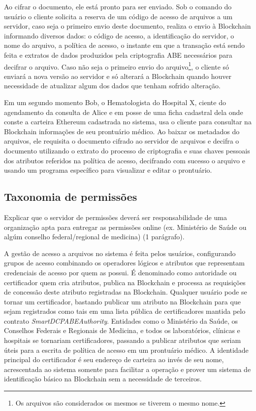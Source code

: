 \documentclass[a4paper,11pt]{article}
\begin{document}
Ao cifrar o documento, ele está pronto para ser enviado.
Sob o comando do usuário o cliente solicita a reserva de um código de acesso de arquivos a um servidor, caso seja o primeiro envio deste documento, realiza o envio à Blockchain informando diversos dados: o código de acesso, a identificação do servidor, o nome do arquivo, a política de acesso, o instante em que a transação está sendo feita e extratos de dados produzidos pela criptografia ABE necessários para decifrar o arquivo.
Caso não seja o primeiro envio do arquivo\footnote{Os arquivos são considerados os mesmos se tiverem o mesmo nome.}, o cliente só enviará a nova versão ao servidor e só alterará a Blockchain quando houver necessidade de atualizar algum dos dados que tenham sofrido alteração.

Em um segundo momento Bob, o Hematologista do Hospital X, ciente do agendamento da consulta de Alice e em posse de uma ficha cadastral dela onde conste a carteira Ethereum cadastrada no sistema, usa o cliente para consultar na Blockchain informações de seu prontuário médico.
Ao baixar os metadados do arquivos, ele requisita o documento cifrado ao servidor de arquivos e decifra o documento utilizando o extrato do processo de criptografia e suas chaves pessoais dos atributos referidos na política de acesso, decifrando com sucesso o arquivo e usando um programa específico para visualizar e editar o prontuário.

\subsection{Taxonomia de permissões}

{\color{ForestGreen}Explicar que o servidor de permissões deverá ser responsabilidade de uma organização apta para entregar as permissões online (ex. Ministério de Saúde ou algúm conselho federal/regional de medicina) (1 parágrafo)}.

A gestão de acesso a arquivos no sistema é feita pelos usuários, configurando grupos de acesso combinando os operadores lógicos e atributos que representam credenciais de acesso por quem as possui.
É denominado como autoridade ou certificador quem cria atributos, publica na Blockchain e processa as requisições de concessão deste atributo registradas na Blockchain.
Qualquer usuário pode se tornar um certificador, bastando publicar um atributo na Blockchain para que sejam registrados como tais em uma lista pública de certificadores mantida pelo contrato \emph{SmartDCPABEAuthority}.
Entidades como o Ministério da Saúde, os Conselhos Federais e Regionais de Medicina, e todos os laboratórios, clínicas e hospitais se tornariam certificadores, passando a publicar atributos que seriam úteis para a escrita de política de acesso em um prontuário médico.
A identidade principal do certificador é seu endereço de carteira ao invés de seu nome, acrescentada ao sistema somente para facilitar a operação e prover um sistema de identificação básico na Blockchain sem a necessidade de terceiros.
\end{document}

